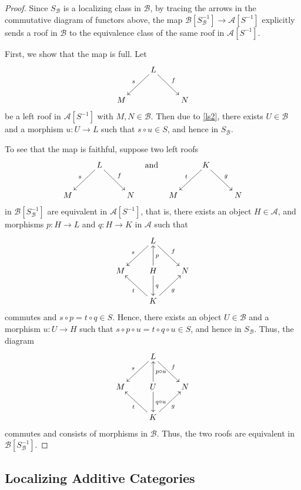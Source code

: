 \documentclass[11pt]{article}
\theoremstyle{thmstyle}
\theoremstyle{defstyle}
\newcommand{\scrA}{\mathscr{A}}
\newcommand{\scrB}{\mathscr{B}}
\begin{document}
\begin{proof}
	Since $S_\scrB$ is a localizing class in $\scrB$, by tracing the arrows in the commutative diagram of functors above, the map $\scrB[S_\scrB^{-1}]\to\scrA[S^{-1}]$ explicitly sends a roof in $\scrB$ to the equivalence class of the same roof in $\scrA[S^{-1}]$. 

	First, we show that the map is full. Let 
	\begin{equation*}
		\xymatrix {
			& L\ar[ld]_s\ar[rd]^f & \\
			M & & N
		}
	\end{equation*}
	be a left roof in $\scrA[S^{-1}]$ with $M, N\in\scrB$. Then due to \ref{ls2}, there exists $U\in\scrB$ and a morphism $u\colon U\to L$ such that $s\circ u\in S$, and hence in $S_{\scrB}$.

	To see that the map is faithful, suppose two left roofs 
	\begin{equation*}
		\xymatrix {
			& L\ar[ld]_s\ar[rd]^f & \\
			M & & N
		}
		\quad\text{and}\quad 
		\xymatrix {
			& K\ar[ld]_t\ar[rd]^g & \\
			M && N
		}
	\end{equation*}
	in $\scrB[S_{\scrB}^{-1}]$ are equivalent in $\scrA[S^{-1}]$, that is, there exists an object $H\in\scrA$, and morphisms $p\colon H\to L$ and $q\colon H\to K$ in $\scrA$ such that 
	\begin{equation*}
		\xymatrix {
			& L\ar[ld]_s\ar[rd]^f & \\
			M & H\ar[u]_p\ar[d]^q & N\\
			& K\ar[lu]^t\ar[ru]_g & 
		}
	\end{equation*}
	commutes and $s\circ p = t\circ q\in S$. Hence, there exists an object $U\in\scrB$ and a morphism $u\colon U\to H$ such that $s\circ p\circ u = t\circ q \circ u\in S$, and hence in $S_{\scrB}$. Thus, the diagram 
	\begin{equation*}
		\xymatrix {
			& L\ar[ld]_s\ar[rd]^f & \\
			M & U\ar[u]_{p\circ u}\ar[d]^{q\circ u} & N\\
			& K\ar[lu]^t\ar[ru]_g & 
		}
	\end{equation*}
	commutes and consists of morphisms in $\scrB$. Thus, the two roofs are equivalent in $\scrB[S_{\scrB}^{-1}]$.
\end{proof}

\subsection{Localizing Additive Categories}
\end{document}
